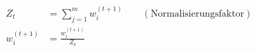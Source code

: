 \begin{align*}
    Z_t         & =\sum_{j=1}^m w^{(t+1)}_i\qquad(\text{Normalisierungsfaktor}) \\
    w^{(t+1)}_i & = \frac{w^{(t+1)}_i}{Z_t}
\end{align*}